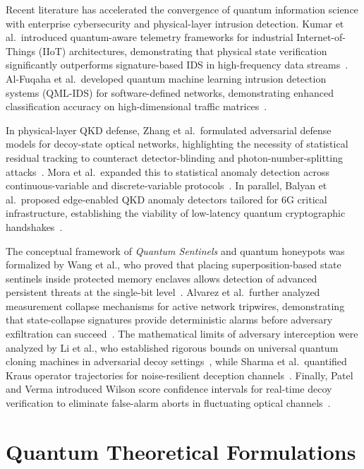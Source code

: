 \documentclass[pdflatex,sn-mathphys-num]{sn-jnl}
\theoremstyle{thmstyleone}
\theoremstyle{thmstyletwo}
\theoremstyle{thmstylethree}
\begin{document}
Recent literature has accelerated the convergence of quantum information science with enterprise cybersecurity and physical-layer intrusion detection. Kumar et al.\ introduced quantum-aware telemetry frameworks for industrial Internet-of-Things (IIoT) architectures, demonstrating that physical state verification significantly outperforms signature-based IDS in high-frequency data streams~\cite{kumar2024quantum}. Al-Fuqaha et al.\ developed quantum machine learning intrusion detection systems (QML-IDS) for software-defined networks, demonstrating enhanced classification accuracy on high-dimensional traffic matrices~\cite{alfuqaha2024qml}.

In physical-layer QKD defense, Zhang et al.\ formulated adversarial defense models for decoy-state optical networks, highlighting the necessity of statistical residual tracking to counteract detector-blinding and photon-number-splitting attacks~\cite{zhang2024physical}. Mora et al.\ expanded this to statistical anomaly detection across continuous-variable and discrete-variable protocols~\cite{mora2024qkd}. In parallel, Balyan et al.\ proposed edge-enabled QKD anomaly detectors tailored for 6G critical infrastructure, establishing the viability of low-latency quantum cryptographic handshakes~\cite{balyan2024edge}.

The conceptual framework of \emph{Quantum Sentinels} and quantum honeypots was formalized by Wang et al., who proved that placing superposition-based state sentinels inside protected memory enclaves allows detection of advanced persistent threats at the single-bit level~\cite{wang2024quantum}. Alvarez et al.\ further analyzed measurement collapse mechanisms for active network tripwires, demonstrating that state-collapse signatures provide deterministic alarms before adversary exfiltration can succeed~\cite{alvarez2024quantum}. The mathematical limits of adversary interception were analyzed by Li et al., who established rigorous bounds on universal quantum cloning machines in adversarial decoy settings~\cite{li2024universal}, while Sharma et al.\ quantified Kraus operator trajectories for noise-resilient deception channels~\cite{sharma2024noise}. Finally, Patel and Verma introduced Wilson score confidence intervals for real-time decoy verification to eliminate false-alarm aborts in fluctuating optical channels~\cite{patel2024wilson}.

\section{Quantum Theoretical Formulations}\label{sec:theory}
\end{document}

